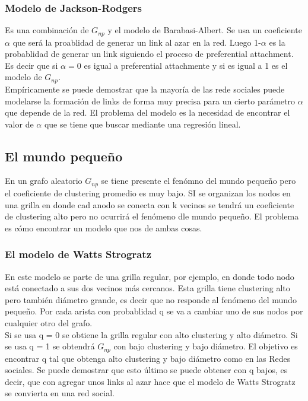 \documentclass[titlepage,a4paper]{article}
\begin{document}
\subsubsection*{Modelo de Jackson-Rodgers}
Es una combinación de $G_{np}$ y el modelo de Barabasi-Albert. Se usa un coeficiente $\alpha$ que será la proablidad de generar un link al azar en la red. Luego 1-$\alpha$ es la probablidad de generar un link siguiendo el proceso de preferential attachment. \\

Es decir que si $\alpha = 0$ es igual a preferential attachmente y si es igual a 1 es el modelo de  $G_{np}$. \\

Empíricamente se puede demostrar que la mayoría de las rede sociales puede modelarse la formación de links de forma muy precisa para un cierto parámetro $\alpha$ que depende de la red. El problema del modelo es la necesidad de encontrar el valor de $\alpha$ que se tiene que buscar mediante una regresión lineal. 

\subsection*{El mundo pequeño}
En un grafo aleatorio $G_{np}$ se tiene presente el fenómno del mundo pequeño pero el coeficiente de clustering promedio es muy bajo. SI se organizan los nodos en una grilla en donde cad anodo se conecta con k vecinos se tendrá un coeficiente de clustering alto pero no ocurrirá el fenómeno dle mundo pequeño. El problema es cómo encontrar un modelo que nos de ambas cosas. 

\subsubsection*{El modelo de Watts Strogratz}
En este modelo se parte de una grilla regular, por ejemplo, en donde todo nodo está conectado a sus dos vecinos más cercanos. Esta grilla tiene clustering alto pero también diámetro grande, es decir que no responde al fenómeno del mundo pequeño. Por cada arista con probablidad q se va a cambiar uno de sus nodos por cualquier otro del grafo. \\

Si se usa q = 0 se obtiene la grilla regular con alto clustering y alto diámetro. Si se usa q = 1 se obtendrá $G_{np}$ con bajo clustering y bajo diámetro. El objetivo es encontrar q tal que obtenga alto clustering y bajo diámetro como en las Redes sociales. Se puede demostrar que esto último se puede obtener con q bajos, es decir, que con agregar unos links al azar hace que el modelo de Watts Strogratz se convierta en una red social. \\
\end{document}
